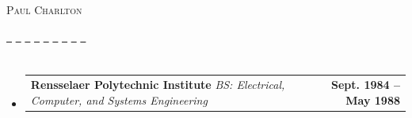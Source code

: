 \documentclass[letterpaper,11pt]{article}
\makeatletter
\newcommand{\resumeSubheading}[4]{
    \vspace{-2pt}\item
    \begin{tabular*}{1.0\textwidth}[t]{l@{\extracolsep{\fill}}r}
    \textbf{#1}  \textit{\small#3} & \textbf{\small #2} \\
    \end{tabular*}\vspace{-7pt}
}
\newcommand{\resumeSubHeadingListStart}{\begin{itemize}[leftmargin=0.0in, label={}]}
\newcommand{\resumeSubHeadingListEnd}{\end{itemize}}
\newcommand{\sectionwithnote}[2]{%
\section[#1]{%
\noindent
\makebox[\textwidth]{\textbf{\Large #1} \hfill \textit{#2}}%
}%
}
\makeatother
\begin{document}

\begin{center}
{\Huge \scshape Paul Charlton} \\ \vspace{4pt}

\href{mailto:techguru@byiq.com}{\raisebox{-0.2\height}\faEnvelope\ } \quad
\href{https://github.com/PaulCharlton}{\raisebox{-0.2\height}\faGithub\ } \quad
\href{https://gitlab.com/techguru}{\raisebox{-0.2\height}\faGitlab\ } \quad
\href{https://www.linkedin.com/in/techguru/}{\raisebox{-0.2\height}\faLinkedin\ } \quad
\href{https://paul-charlton.vercel.app/}{\raisebox{-0.2\height}\faGlobe\ } \quad
\href{https://en.wikipedia.org/wiki/Paul_Charlton_(technologist)}{\raisebox{-0.2\height}\faWikipediaW\ } \quad
\href{tel:+18082787904}{\raisebox{-0.2\height}\faPhone\ } \quad
\href{https://signal.me/#p/+18082787904}{\raisebox{-0.2\height}\faComment\ } \quad
\href{https://wa.me/18082787904}{\raisebox{-0.2\height}\faWhatsapp\ }

\vspace{-8pt}
\end{center}



\sectionwithnote{EDUCATION}{}
\resumeSubHeadingListStart
\resumeSubheading
{Rensselaer Polytechnic Institute}
{Sept. 1984 -- May 1988}
{BS: Electrical, Computer, and Systems Engineering}
{Troy, New York}
\resumeSubHeadingListEnd
\end{document}
